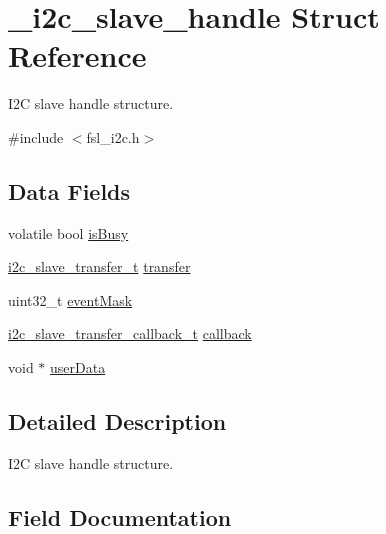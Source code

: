 \hypertarget{struct__i2c__slave__handle}{}\section{\+\_\+i2c\+\_\+slave\+\_\+handle Struct Reference}
\label{struct__i2c__slave__handle}


I2C slave handle structure.  




{\ttfamily \#include $<$fsl\+\_\+i2c.\+h$>$}

\subsection*{Data Fields}
\begin{DoxyCompactItemize}
\item 
volatile bool \mbox{\hyperlink{struct__i2c__slave__handle_a4db252b6dbdb0dc9cc3d7ddbcb5e9511}{is\+Busy}}
\item 
\mbox{\hyperlink{group__i2c__driver_ga69e696cb21165bc58176475879a471cf}{i2c\+\_\+slave\+\_\+transfer\+\_\+t}} \mbox{\hyperlink{struct__i2c__slave__handle_a8cfa005502ce2f110a54f99672380f5f}{transfer}}
\item 
uint32\+\_\+t \mbox{\hyperlink{struct__i2c__slave__handle_acf2922a79dce3fb9f7c7fe948de1f5a8}{event\+Mask}}
\item 
\mbox{\hyperlink{group__i2c__driver_ga2583e3d8ebf8d3de410d8b6263238c35}{i2c\+\_\+slave\+\_\+transfer\+\_\+callback\+\_\+t}} \mbox{\hyperlink{struct__i2c__slave__handle_a8630826ced50476e2c1446747c3b2f03}{callback}}
\item 
void $\ast$ \mbox{\hyperlink{struct__i2c__slave__handle_a2e294dd14122c554baa0665072b4ca7a}{user\+Data}}
\end{DoxyCompactItemize}


\subsection{Detailed Description}
I2C slave handle structure. 

\subsection{Field Documentation}
\mbox{\label{struct__i2c__slave__handle_a8630826ced50476e2c1446747c3b2f03}} 
